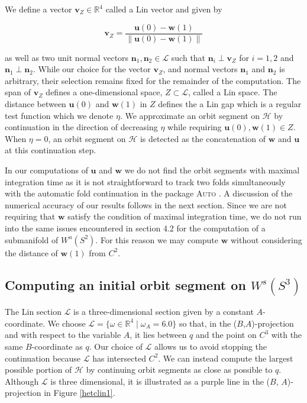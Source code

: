 \documentclass{ws-ijbc}
\begin{document}
We define a vector $\mathbf{v}_Z \in \mathbb{R}^4$ called a Lin vector and given by 

	\begin{equation}
		\mathbf{v}_Z = \frac{\mathbf{u}(0) - \mathbf{w}(1)}{\left\lVert \mathbf{u}(0) - \mathbf{w}(1) \right\lVert}
		\label{Lin_vector}
	\end{equation}
	
\noindent	
as well as two unit normal vectors $\mathbf{n}_1, \mathbf{n}_2 \in \mathscr{L}$ such that $\mathbf{n}_i \perp \mathbf{v}_Z$ for $i=1,2$ and $\mathbf{n}_1 \perp \mathbf{n}_2$.  While our choice for the vector $\mathbf{v}_Z$, and normal vectors $\mathbf{n}_1$ and $\mathbf{n}_2$ is arbitrary, their selection remains fixed for the remainder of the computation.  The span of $\mathbf{v}_Z$ defines a one-dimensional space, $Z \subset \mathscr{L}$, called a Lin space.  The distance between $\mathbf{u}(0)$ and $\mathbf{w}(1)$ in $Z$ defines the a Lin gap which is a regular test function which we denote $\eta$.  We approximate an orbit segment on $\mathscr{H}$ by continuation in the direction of decreasing $\eta$ while requiring $\mathbf{u}(0), \mathbf{w}(1) \in Z$.  When  $\eta = 0$, an orbit segment on $\mathscr{H}$ is detected as the concatenation of $\mathbf{w}$ and $\mathbf{u}$ at this continuation step.

In our computations of $\mathbf{u}$ and $\mathbf{w}$ we do not find the orbit segments with maximal integration time as it is not straightforward to track two folds simultaneously with the automatic fold continuation in the package \textsc{Auto} \cite{AUTO}.  A discussion of the numerical accuracy of our results follows in the next section.  Since we are not requiring that $\mathbf{w}$ satisfy the condition of maximal integration time, we do not run into the same issues encountered in section 4.2 for the computation of a submanifold of $W^u(S^2)$.  For this reason we may compute $\mathbf{w}$ without considering the distance of $\mathbf{w}(1)$ from $C^2$.

\subsection{Computing an initial orbit segment on $W^s(S^3)$}

The Lin section $\mathscr{L}$ is a three-dimensional section given by a constant $A$-coordinate.  We choose $\mathscr{L} = \{\omega \in \mathbb{R}^4 \; | \; \omega_A = 6.0 \}$ so that, in the ($B$,$A$)-projection and with respect to the variable $A$, it lies between $q$ and the point on $C^3$ with the same $B$-coordinate as $q$.  Our choice of $\mathscr{L}$ allows us to avoid stopping the continuation because $\mathscr{L}$ has intersected $C^2$.  We can instead compute the largest possible portion of $\mathscr{H}$ by continuing orbit segments as close as possible to $q$.  Although $\mathscr{L}$ is three dimensional, it is illustrated as a purple line in the ($B$, $A$)-projection in Figure \ref{hetclin1}.
\end{document}
